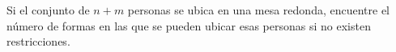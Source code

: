 Si el conjunto de \(n+m\) personas se ubica en una mesa redonda, encuentre el número de formas en las que se pueden ubicar esas personas si no existen restricciones.
